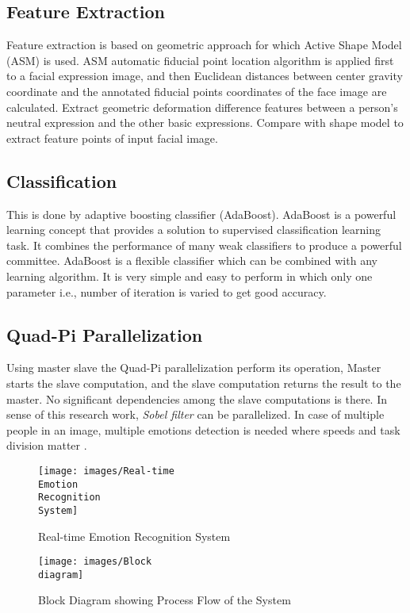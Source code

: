 \subsection{Feature Extraction}
Feature extraction is based on geometric approach for which Active Shape Model (ASM) is used. ASM automatic fiducial point location algorithm is applied first to a facial expression image, and then Euclidean distances between center gravity coordinate and the annotated fiducial points coordinates of the face image are calculated. Extract geometric deformation difference features between a person's neutral expression and the other basic expressions. Compare with shape model to extract feature points of input facial image.

\subsection{Classification}
This is done by adaptive boosting classifier (AdaBoost). AdaBoost is a powerful learning concept that provides a solution to supervised classification learning task. It combines the performance of many weak classifiers to produce a powerful committee. AdaBoost is a flexible classifier which can be combined with any learning algorithm. It is very simple and easy to perform in which only one parameter i.e., number of iteration is varied to get good accuracy.

\subsection{Quad-Pi Parallelization}
Using master slave the Quad-Pi parallelization perform its operation, Master starts the slave computation, and the slave computation returns the result to the master. No significant dependencies among the slave computations is there. In sense of this research work, \textit{Sobel filter} can be parallelized. In case of multiple people in an image, multiple emotions detection is needed where speeds and task division matter \cite{redmon2016}.

\begin{figure}[htb]
\centering
\texttt{[image: images/Real-time\\ Emotion\\ Recognition\\ System]}
\caption{Real-time Emotion Recognition System}
\label{fig:erSystem}
\end{figure}

\begin{figure}[htb]
\centering
\texttt{[image: images/Block\\ diagram]}
\caption{Block Diagram showing Process Flow of the System}
\label{fig:bd}
\end{figure}

